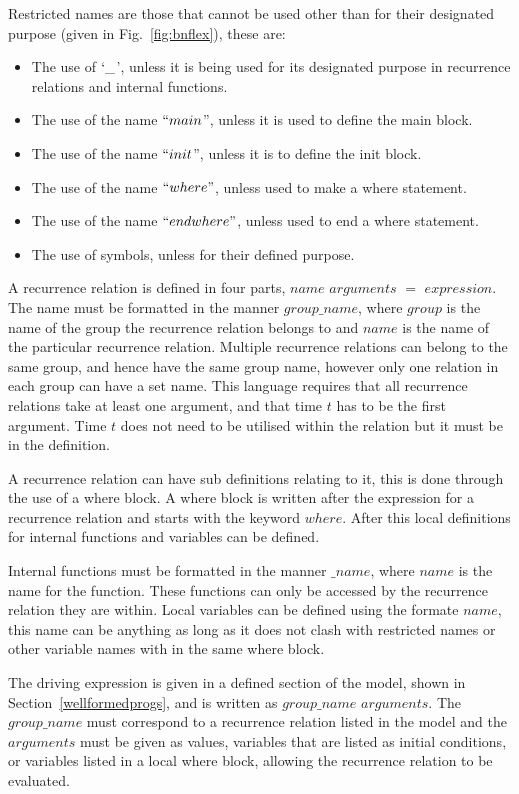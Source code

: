 \documentclass{article}
\begin{document}
Restricted names are those that cannot be used other than for their designated purpose (given in Fig.~\ref{fig:bnflex}), these are:
\begin{itemize}
  \item The use of $`\_$', unless it is being used for its designated purpose in recurrence relations and internal functions. 
  \item The use of the name $``main$'', unless it is used to define the main block.
  \item The use of the name $``init$'', unless it is to define the init block.
  \item The use of the name $``where"$, unless used to make a where statement.
  \item The use of the name $``endwhere"$, unless used to end a where statement.
  \item The use of symbols, unless for their defined purpose.  
\end{itemize}

A recurrence relation is defined in four parts, $name$ $arguments$ $=$ $expression$. The name must be formatted in the manner $group\_name$, where $group$ is the name of the group the recurrence relation belongs to and $name$ is the name of the particular recurrence relation. Multiple recurrence relations can belong to the same group, and hence have the same group name, however only one relation in each group can have a set name. This language requires that all recurrence relations take at least one argument, and that time $t$ has to be the first argument. Time $t$ does not need to be utilised within the relation but it must be in the definition.     

A recurrence relation can have sub definitions relating to it, this is done through the use of a where block. A where block is written after the expression for a recurrence relation and starts with the keyword $where$. After this local definitions for internal functions and variables can be defined. 

Internal functions must be formatted in the manner $\_name$, where $name$ is the name for the function. These functions can only be accessed by the recurrence relation they are within. Local variables can be defined using the formate $name$, this name can be anything as long as it does not clash with restricted names or other variable names with in the same where block. 

The driving expression is given in a defined section of the model, shown in Section~\ref{wellformedprogs}, and is written as  $group\_name$ $arguments$. The  $group\_name$ must correspond to a recurrence relation listed in the model and the $arguments$ must be given as values, variables that are listed as initial conditions, or variables listed in a local where block, allowing the recurrence relation to be evaluated. 
\end{document}
